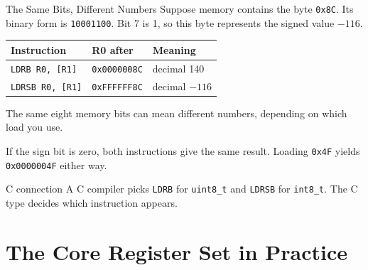 \documentclass[9pt,aspectratio=169,xcolor=table]{beamer}
\newcommand{\striped}{\rowcolors{1}{white}{stripe}}
\begin{document}
\begin{frame}[fragile]{The Same Bits, Different Numbers}
    \leavevmode
    {\small Suppose memory contains the byte \texttt{0x8C}. Its binary form
    is \texttt{10001100}. Bit 7 is 1, so this byte represents the signed
    value \alert{$-116$}.}

    \vspace{3mm}
    \begin{center}
    {\small
    \striped
    \begin{tabular}{@{}l l R{.42\textwidth}@{}}
        \toprule
        \textbf{Instruction} & \textbf{R0 after} & \textbf{Meaning} \\
        \midrule
        \texttt{LDRB  R0, [R1]} & \texttt{0x0000008C} & decimal 140 \\
        \texttt{LDRSB R0, [R1]} & \texttt{0xFFFFFF8C} & decimal $-116$ \\
        \bottomrule
    \end{tabular}}
    \end{center}

    \vspace{3mm}
    {\small The \alert{same eight memory bits} can mean different numbers,
    depending on which load you use.}

    \vspace{2mm}
    {\small If the sign bit is zero, both instructions give the same
    result. Loading \texttt{0x4F} yields \texttt{0x0000004F} either way.}

    \vspace{3mm}
    \begin{block}{C connection}
        A C compiler picks \texttt{LDRB} for \texttt{uint8\_t} and
        \texttt{LDRSB} for \texttt{int8\_t}. The C type decides which
        instruction appears.
    \end{block}
\end{frame}

\section{The Core Register Set in Practice}
\end{document}
